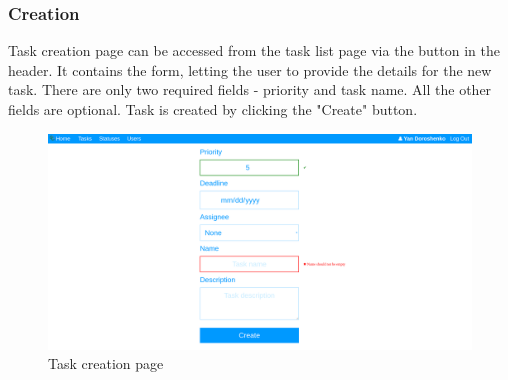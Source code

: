 \documentclass{article}
\begin{document}
\subsubsection{Creation}
Task creation page can be accessed from the task list page via the button in the header. It contains the form, letting the user to provide the details for the new task. There are only two required fields - priority and task name. All the other fields are optional. Task is created by clicking the "Create" button.
\begin{figure}[H]
    \includegraphics[width=\textwidth]{img/createtask.png}
    \caption{Task creation page}
\end{figure}
\end{document}
